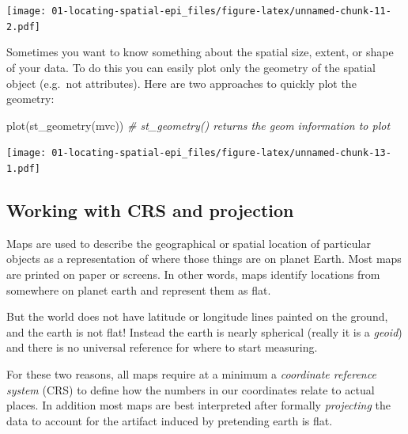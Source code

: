 \documentclass[
]{book}
\newenvironment{Shaded}{\begin{snugshade}}{\end{snugshade}}
\newcommand{\CommentTok}[1]{\textcolor[rgb]{0.56,0.35,0.01}{\textit{#1}}}
\newcommand{\FunctionTok}[1]{\textcolor[rgb]{0.00,0.00,0.00}{#1}}
\newcommand{\NormalTok}[1]{#1}
\newcommand{\SpecialCharTok}[1]{\textcolor[rgb]{0.00,0.00,0.00}{#1}}
\begin{document}
\texttt{[image: 01-locating-spatial-epi\_files/figure-latex/unnamed-chunk-11-2.pdf]}

Sometimes you want to know something about the spatial size, extent, or shape of your data. To do this you can easily plot only the geometry of the spatial object (e.g.~not attributes). Here are two approaches to quickly plot the geometry:

\begin{Shaded}
\begin{Highlighting}[]
\FunctionTok{plot}\NormalTok{(}\FunctionTok{st\_geometry}\NormalTok{(mvc)) }\CommentTok{\# st\_geometry() returns the geom information to plot}
\end{Highlighting}
\end{Shaded}

\begin{Shaded}
\end{Shaded}

\texttt{[image: 01-locating-spatial-epi\_files/figure-latex/unnamed-chunk-13-1.pdf]}

\hypertarget{working-with-crs-and-projection}{%
\subsection{Working with CRS and projection}\label{working-with-crs-and-projection}}

Maps are used to describe the geographical or spatial location of particular objects as a representation of where those things are on planet Earth. Most maps are printed on paper or screens. In other words, maps identify locations from somewhere on planet earth and represent them as flat.

But the world does not have latitude or longitude lines painted on the ground, and the earth is not flat! Instead the earth is nearly spherical (really it is a \emph{geoid}) and there is no universal reference for where to start measuring.

For these two reasons, all maps require at a minimum a \emph{coordinate reference system} (CRS) to define how the numbers in our coordinates relate to actual places. In addition most maps are best interpreted after formally \emph{projecting} the data to account for the artifact induced by pretending earth is flat.
\end{document}
